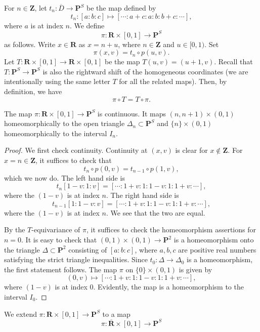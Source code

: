 \documentclass{amsart}
\begin{document}
For \(n \in \mathbf{Z}\), let \(t_{n} \colon \overline D \to \mathbf{P}^S\) be the map defined by
\[ t_n \colon [a:b:c] \mapsto [\cdots : a+c :a :b:b+c: \cdots],\]
where \(a\) is at index \(n\).
We define
\[ \pi \colon \mathbf{R} \times [0,1] \to \mathbf{P}^S\]
as follows.
Write \(x \in \mathbf{R}\) as \(x = n + u\), where \(n \in \mathbf{Z}\) and \(u \in [0,1)\).
Set
\[ \pi (x,v) = t_n \circ p (u,v).\]
Let \(T \colon \mathbf{R} \times [0,1] \to \mathbf{R} \times [0,1]\) be the map \(T(u,v) = (u+1,v)\).
Recall that \(T \colon \mathbf{P}^S \to \mathbf{P}^S\) is also the rightward shift of the homogeneous coordinates (we are intentionally using the same letter \(T\) for all the related maps).
Then, by definition, we have
\[ \pi \circ T = T \circ \pi.\]
\begin{proposition}\label{prop:pi-interior}
  The map \(\pi \colon \mathbf{R} \times [0,1] \to \mathbf{P}^{S}\) is continuous.
  It maps \((n,n+1) \times (0,1)\) homeomorphically to the open triangle \(\Delta_n \subset \mathbf{P}^S\) and \(\{n\} \times (0,1)\) homeomorphically to the interval \(I_n\).
\end{proposition}
\begin{proof}
  We first check continuity.
  Continuity at \((x,v)\) is clear for \(x \not \in \mathbf{Z}\).
  For \(x = n \in \mathbf{Z}\), it suffices to check that
  \[ t_n \circ p(0,v) = t_{n-1} \circ p(1,v),\]
  which we now do.
  The left hand side is
  \[ t_n[1-v:1:v] = [\cdots : 1+v : 1 : 1-v  : 1 : 1 + v : \cdots ],\]
  where the \((1-v)\) is at index \(n\).
  The right hand side is
  \[ t_{n-1}[1:1-v:v] = [\cdots : 1 + v : 1 : 1-v : 1 : 1+v : \cdots ],\]
  where the \((1-v)\) is at index \(n\).
  We see that the two are equal.

  By the \(T\)-equivariance of \(\pi\), it suffices to check the homeomorphism assertions for \(n = 0\).
  It is easy to check that \((0,1) \times (0,1) \to \mathbf{P}^2\) is a homeomorphism onto the triangle \(\Delta \subset \mathbf{P}^2\) consisting of \([a:b:c]\), where \(a,b,c\) are positive real numbers satisfying the strict triangle inequalities.
  Since \(t_0 \colon \Delta \to \Delta_0\) is a homeomorphism, the first statement follows.
  The map \(\pi\) on \(\{0\} \times (0,1)\) is given by \[(0,v) \mapsto [\cdots :1+v : 1 :1-v:1:1+v:\cdots],\] where \((1-v)\) is at index 0.
  Evidently, the map is a homeomorphism to the interval \(I_0\).
\end{proof}
We extend \(\pi \colon \mathbf{R} \times [0,1] \to \mathbf{P}^{S}\) to a map
\[ \pi \colon \overline{\mathbf{R}} \times [0,1] \to \mathbf{P}^S\]
\end{document}
